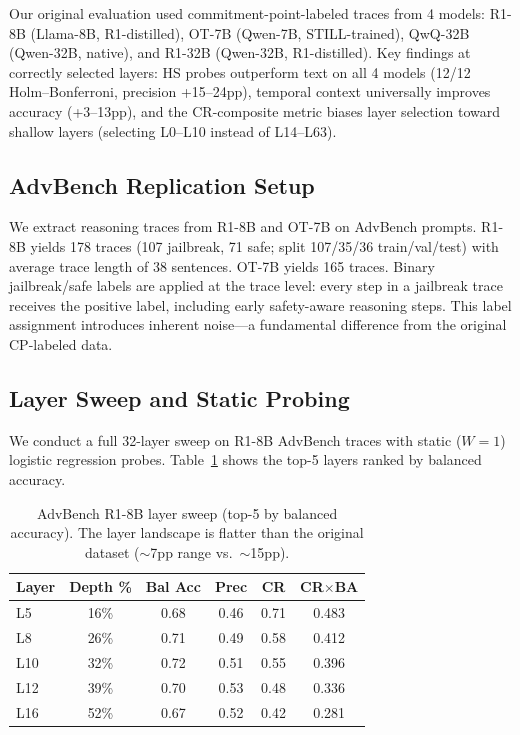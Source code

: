 \documentclass[11pt]{article}
\begin{document}
Our original evaluation used commitment-point-labeled traces from 4 models: R1-8B (Llama-8B, R1-distilled), OT-7B (Qwen-7B, STILL-trained), QwQ-32B (Qwen-32B, native), and R1-32B (Qwen-32B, R1-distilled). Key findings at correctly selected layers: HS probes outperform text on all 4 models (12/12 Holm--Bonferroni, precision +15--24pp), temporal context universally improves accuracy (+3--13pp), and the CR-composite metric biases layer selection toward shallow layers (selecting L0--L10 instead of L14--L63).

\subsection{AdvBench Replication Setup}

We extract reasoning traces from R1-8B and OT-7B on AdvBench prompts. R1-8B yields 178 traces (107 jailbreak, 71 safe; split 107/35/36 train/val/test) with average trace length of 38 sentences. OT-7B yields 165 traces. Binary jailbreak/safe labels are applied at the trace level: every step in a jailbreak trace receives the positive label, including early safety-aware reasoning steps. This label assignment introduces inherent noise---a fundamental difference from the original CP-labeled data.

\subsection{Layer Sweep and Static Probing}
\label{sec:layer-sweep}

We conduct a full 32-layer sweep on R1-8B AdvBench traces with static ($W{=}1$) logistic regression probes. Table~\ref{tab:layer-sweep} shows the top-5 layers ranked by balanced accuracy.

\begin{table}[t]
\centering
\small
\caption{AdvBench R1-8B layer sweep (top-5 by balanced accuracy). The layer landscape is flatter than the original dataset ($\sim$7pp range vs.\ $\sim$15pp).}
\label{tab:layer-sweep}
\begin{tabular}{lccccc}
\toprule
Layer & Depth \% & Bal Acc & Prec & CR & CR$\times$BA \\
\midrule
L5  & 16\% & 0.68 & 0.46 & 0.71 & 0.483 \\
L8  & 26\% & 0.71 & 0.49 & 0.58 & 0.412 \\
L10 & 32\% & 0.72 & 0.51 & 0.55 & 0.396 \\
L12 & 39\% & 0.70 & 0.53 & 0.48 & 0.336 \\
L16 & 52\% & 0.67 & 0.52 & 0.42 & 0.281 \\
\bottomrule
\end{tabular}
\end{table}
\end{document}

